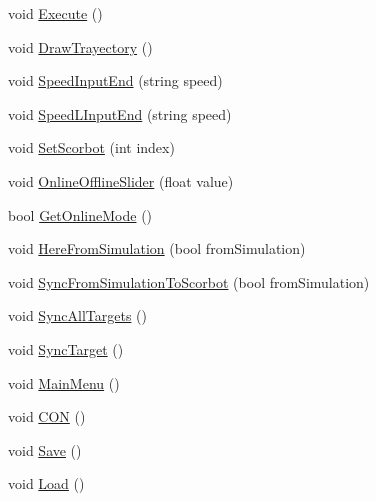 \begin{DoxyCompactItemize}
\item 
void \mbox{\hyperlink{class_game_controller_ac1dcb5c2f0422f5568ca776dd5cd7b7c}{Execute}} ()
\item 
void \mbox{\hyperlink{class_game_controller_afd55aa0db0046a73a2b9bb57dc56d373}{Draw\+Trayectory}} ()
\item 
void \mbox{\hyperlink{class_game_controller_a7a993b5ee6e6376f81670d3958d48bb6}{Speed\+Input\+End}} (string speed)
\item 
void \mbox{\hyperlink{class_game_controller_aa10e8ec20019adfd8f3c2dfbea4ff8bc}{Speed\+L\+Input\+End}} (string speed)
\item 
void \mbox{\hyperlink{class_game_controller_aa448386fb4d83ff0ca9211424ad6b020}{Set\+Scorbot}} (int index)
\item 
void \mbox{\hyperlink{class_game_controller_a48800115bee7dd138485ca7cd1464f78}{Online\+Offline\+Slider}} (float value)
\item 
bool \mbox{\hyperlink{class_game_controller_ab8bc597c4e47a3cece068762cdfaf33a}{Get\+Online\+Mode}} ()
\item 
void \mbox{\hyperlink{class_game_controller_a6ac352c2a0b3dafb1da0a71fb047736e}{Here\+From\+Simulation}} (bool from\+Simulation)
\item 
void \mbox{\hyperlink{class_game_controller_a3e908f52a48528254dddc0f4f4a9d9f8}{Sync\+From\+Simulation\+To\+Scorbot}} (bool from\+Simulation)
\item 
void \mbox{\hyperlink{class_game_controller_ab42ee9c1c07fc60cb506b769bd6047c9}{Sync\+All\+Targets}} ()
\item 
void \mbox{\hyperlink{class_game_controller_afb0be280e9e68853555db2ef42337bd9}{Sync\+Target}} ()
\item 
void \mbox{\hyperlink{class_game_controller_aae26868d4e9c6e735d5fef9cc7b15bb1}{Main\+Menu}} ()
\item 
void \mbox{\hyperlink{class_game_controller_ae9fc70a12ad70871780529854ea12d9c}{C\+ON}} ()
\item 
void \mbox{\hyperlink{class_game_controller_a59400b0ec3bf7841017faafba0a35f81}{Save}} ()
\item 
void \mbox{\hyperlink{class_game_controller_a7ae3bede521e0a3c4c80dc9ede03ba90}{Load}} ()
\end{DoxyCompactItemize}

